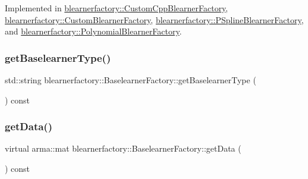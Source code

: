 Implemented in \hyperlink{classblearnerfactory_1_1_custom_cpp_blearner_factory_ac98fae043e6822605261c7c6f7125e8c}{blearnerfactory\+::\+Custom\+Cpp\+Blearner\+Factory}, \hyperlink{classblearnerfactory_1_1_custom_blearner_factory_aad915d1ac58a323d1584d27f8cdace56}{blearnerfactory\+::\+Custom\+Blearner\+Factory}, \hyperlink{classblearnerfactory_1_1_p_spline_blearner_factory_a877072332da418456dcbcb27c572c1e7}{blearnerfactory\+::\+P\+Spline\+Blearner\+Factory}, and \hyperlink{classblearnerfactory_1_1_polynomial_blearner_factory_ac0c7f742da0a2de444e91a0cfb0a9384}{blearnerfactory\+::\+Polynomial\+Blearner\+Factory}.

\mbox{\label{classblearnerfactory_1_1_baselearner_factory_a05d5c00f7a434548868c4ad21d0f5fda}} 
\subsubsection{\texorpdfstring{get\+Baselearner\+Type()}{getBaselearnerType()}}
{\footnotesize\ttfamily std\+::string blearnerfactory\+::\+Baselearner\+Factory\+::get\+Baselearner\+Type (\begin{DoxyParamCaption}{ }\end{DoxyParamCaption}) const}

\mbox{\label{classblearnerfactory_1_1_baselearner_factory_aa3e4580bca870ca3b742dda6c820e1e6}} 
\subsubsection{\texorpdfstring{get\+Data()}{getData()}}
{\footnotesize\ttfamily virtual arma\+::mat blearnerfactory\+::\+Baselearner\+Factory\+::get\+Data (\begin{DoxyParamCaption}{ }\end{DoxyParamCaption}) const\hspace{0.3cm}{\ttfamily [pure virtual]}}



